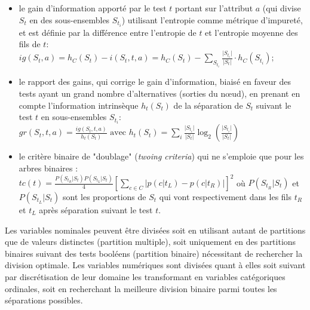 \begin{itemize}
	\item le gain d'information apporté par le test $t$ portant sur l'attribut $a$ (qui divise $S_t$ en des sous-ensembles $S_{t_i}$) utilisant l'entropie comme métrique d'impureté, et est définie par la différence entre l'entropie de $t$ et l'entropie moyenne des fils de $t$: \\ $ig(S_t, a) = h_C(S_t) - i(S_t, t, a) =  h_C(S_t) - \sum\limits_{S_{t_i}} \frac{\vert S_{t_i} \vert}{\vert S_{t} \vert} \cdot h_C(S_{t_i});$
	\item le rapport des gains, qui corrige le gain d'information, biaisé en faveur des tests ayant un grand nombre d'alternatives (sorties du nœud), en prenant en compte l'information intrinsèque $h_t(S_t)$ de la séparation de $S_t$ suivant le test $t$ en sous-ensembles $S_{t_i}$: \\$gr(S_t, t, a) = \frac{ig(S_t, t, a)}{h_t(S_t)} \text{ avec } h_t(S_t) = \sum\limits_i \frac{\vert S_{t_i}\vert}{\vert S_t \vert} \log_2 \left(\frac{\vert S_{t_i}\vert}{\vert S_t \vert}\right)$
	\item le critère binaire de "doublage" (\textit{twoing criteria}) qui ne s'emploie que pour les arbres binaires : \\ $tc(t) = \frac{P(S_{t_R} \vert S_t)P(S_{t_L} \vert S_t)}{4} \left[\sum\limits_{c \in C} \vert p(c \vert t_L) - p(c \vert t_R)\vert\right]^2$ où  $P(S_{t_R} \vert S_t)$ et $P(S_{t_L} \vert S_t)$ sont les proportions de $S_t$ qui vont respectivement dans les fils $t_R$ et $t_L$ après séparation suivant le test $t$.
\end{itemize}

Les variables nominales peuvent être divisées soit en utilisant autant de partitions que de valeurs distinctes (partition multiple), soit uniquement en des partitions binaires suivant des tests booléens (partition binaire) nécessitant de rechercher la division optimale. Les variables numériques sont divisées quant à elles soit suivant par discrétisation de leur domaine les transformant en variables catégoriques ordinales, soit en recherchant la meilleure division binaire parmi  toutes les séparations possibles. 

